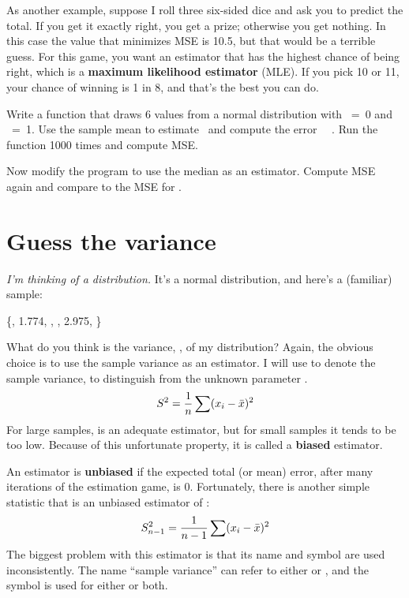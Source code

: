 \documentclass[12pt]{book}
\begin{document}
As another example, suppose I roll three six-sided dice and ask you
to predict the total.  If you get it exactly right, you get a prize;
otherwise you get nothing.  In this case the value that minimizes MSE
is 10.5, but that would be a terrible guess.  For this game, you
want an estimator that has the highest chance of being right, which is
a {\bf maximum likelihood estimator} (MLE).  If you pick 10 or 11, your
chance of winning is 1 in 8, and that's the best you can do.

\begin{exercise}
Write a function that draws 6 values from a normal distribution with
\mymu~=~0 and \mysigma~=~1.  Use the sample mean to estimate \mymu~and
compute the error \myxbar~\minus~\mymu.  Run the function 1000 times and
compute MSE.

Now modify the program to use the median as an
estimator.  Compute MSE again and compare to the MSE for \myxbar.

\end{exercise}


\section{Guess the variance}

{\em I'm thinking of a distribution.}  It's a normal distribution, and 
here's a (familiar) sample:

\{, 1.774, , , 2.975, \}

What do you think is the variance, \sigmasq, of my distribution?
Again, the obvious choice is to use the sample variance as an estimator.
I will use \Ssq to denote the sample variance, to distinguish from the
unknown parameter \sigmasq.
%
\[ S^2 = \frac{1}{n} \sum (x_i - \bar{x})^2 \] 
%
For large samples, \Ssq is an adequate estimator, but for small
samples it tends to be too low.  Because of this unfortunate
property, it is called a {\bf biased} estimator.


An estimator is {\bf unbiased} if the expected total (or mean) error,
after many iterations of the estimation game, is 0.
Fortunately, there is another simple statistic that is an unbiased
estimator of \sigmasq:
%
\[ S_{n-1}^2 = \frac{1}{n-1} \sum (x_i - \bar{x})^2 \] 
%
The biggest problem with this estimator is that its name and symbol
are used inconsistently.  The name ``sample variance'' can refer to
either \Ssq or \Snsq, and the symbol \Ssq is used
for either or both.
\end{document}
